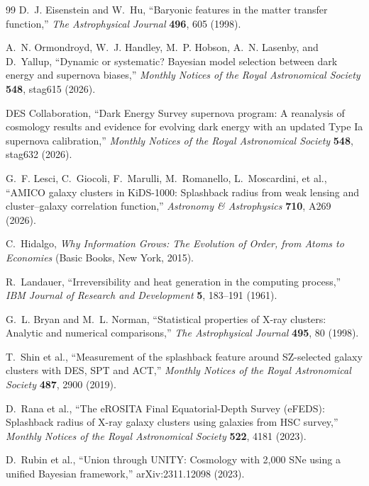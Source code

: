 \documentclass[11pt]{article}
\begin{document}
\begin{thebibliography}{99}
D.~J. Eisenstein and W.~Hu,
``Baryonic features in the matter transfer function,''
\emph{The Astrophysical Journal} \textbf{496}, 605 (1998).

A.~N. Ormondroyd, W.~J. Handley, M.~P. Hobson, A.~N. Lasenby, and D.~Yallup,
``Dynamic or systematic? Bayesian model selection between dark energy and supernova biases,''
\emph{Monthly Notices of the Royal Astronomical Society} \textbf{548}, stag615 (2026).

DES Collaboration,
``Dark Energy Survey supernova program: A reanalysis of cosmology results and evidence for evolving dark energy with an updated Type Ia supernova calibration,''
\emph{Monthly Notices of the Royal Astronomical Society} \textbf{548}, stag632 (2026).

G.~F. Lesci, C.~Giocoli, F.~Marulli, M.~Romanello, L.~Moscardini, et al.,
``AMICO galaxy clusters in KiDS-1000: Splashback radius from weak lensing and cluster--galaxy correlation function,''
\emph{Astronomy \& Astrophysics} \textbf{710}, A269 (2026).

C.~Hidalgo,
\emph{Why Information Grows: The Evolution of Order, from Atoms to Economies}
(Basic Books, New York, 2015).

R.~Landauer,
``Irreversibility and heat generation in the computing process,''
\emph{IBM Journal of Research and Development} \textbf{5}, 183--191 (1961).

G.~L. Bryan and M.~L. Norman,
``Statistical properties of X-ray clusters: Analytic and numerical comparisons,''
\emph{The Astrophysical Journal} \textbf{495}, 80 (1998).

T.~Shin et al.,
``Measurement of the splashback feature around SZ-selected galaxy clusters with DES, SPT and ACT,''
\emph{Monthly Notices of the Royal Astronomical Society} \textbf{487}, 2900 (2019).

D.~Rana et al.,
``The eROSITA Final Equatorial-Depth Survey (eFEDS): Splashback radius of X-ray galaxy clusters using galaxies from HSC survey,''
\emph{Monthly Notices of the Royal Astronomical Society} \textbf{522}, 4181 (2023).

D.~Rubin et al.,
``Union through UNITY: Cosmology with 2,000 SNe using a unified Bayesian framework,''
arXiv:2311.12098 (2023).


\end{thebibliography}
\end{document}
